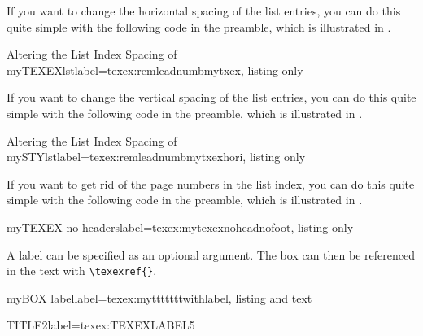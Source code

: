 \documentclass[]{myHOWTO-V001}
\begin{document}
If you want to change the horizontal spacing of the list entries, you can do this quite simple with the following code in the preamble, which is illustrated in .

\begin{myTEXEXdoclst}{Altering the List Index Spacing of myTEXEXlst}{label={texex:remleadnumbmytxex}, listing only}
\makeatletter
	\renewcommand{\l@myTEXEX}{\@dottedtocline{1}{0mm}{0mm}}
\makeatother
\end{myTEXEXdoclst}

If you want to change the vertical spacing of the list entries, you can do this quite simple with the following code in the preamble, which is illustrated in .

\begin{myTEXEXdoclst}{Altering the List Index Spacing of mySTYlst}{label={texex:remleadnumbmytxexhori}, listing only}
\makeatletter
\makeatother
\end{myTEXEXdoclst}

If you want to get rid of the page numbers in the list index, you can do this quite simple with the following code in the preamble, which is illustrated in .

\begin{myTEXEXdoclst}{myTEXEX no headers}{label={texex:mytexexnoheadnofoot}, listing only}
\let\oldlistofmyTEXEX\listofmyTEXEX

\renewcommand\listofmyTEXEX
{
	\pagestyle{empty} %
	\oldlistofmyTEXEX %
	\clearpage %
	\pagestyle{plain} %
}
\end{myTEXEXdoclst}

A label can be specified as an optional argument. The box can then be referenced in the text with \Verb|\texexref{}|.

\begin{myTEXEXdoclst}{myBOX label}{label={texex:mytttttttwithlabel}, listing and text}
\begin{myTEXEXlst}{TITLE2}{label={texex:TEXEXLABEL5}}
\lipsum[4]
\end{myTEXEXlst}
\end{myTEXEXdoclst}
\end{document}
